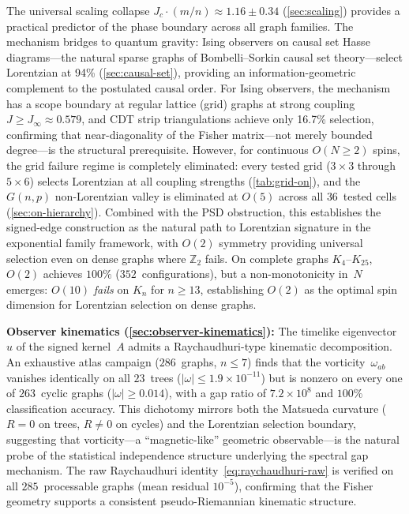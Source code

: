 \documentclass[11pt]{article}
\theoremstyle{definition}
\theoremstyle{remark}
\begin{document}
The universal scaling collapse $J_c \cdot (m/n) \approx 1.16 \pm 0.34$
(\cref{sec:scaling}) provides a practical predictor of the phase boundary
across all graph families. The mechanism bridges to quantum gravity: Ising
observers on causal set Hasse diagrams---the natural sparse graphs of
Bombelli--Sorkin causal set theory---select Lorentzian at 94\%
(\cref{sec:causal-set}), providing an information-geometric complement
to the postulated causal order. For Ising observers, the mechanism has a scope boundary at
regular lattice (grid) graphs at strong coupling $J \geq J_\infty \approx 0.579$,
and CDT strip triangulations achieve only 16.7\%
selection, confirming that near-diagonality of the Fisher matrix---not merely
bounded degree---is the structural prerequisite. However, for continuous
$O(N \geq 2)$ spins, the grid failure regime is completely eliminated:
every tested grid ($3 \times 3$ through $5 \times 6$) selects Lorentzian at
all coupling strengths (\cref{tab:grid-on}), and the $G(n,p)$
non-Lorentzian valley is eliminated at $O(5)$ across all $36$~tested cells
(\cref{sec:on-hierarchy}). Combined with the PSD
obstruction, this establishes the signed-edge construction as the natural
path to Lorentzian signature in the exponential family framework, with
$O(2)$ symmetry providing universal selection even on dense graphs
where $\mathbb{Z}_2$ fails.  On complete graphs $K_4$--$K_{25}$, $O(2)$
achieves $100\%$ ($352$~configurations), but a non-monotonicity in~$N$
emerges: $O(10)$ \emph{fails} on $K_n$ for $n \geq 13$, establishing
$O(2)$ as the optimal spin dimension for Lorentzian selection on dense graphs.

\textbf{Observer kinematics (\cref{sec:observer-kinematics}):}
The timelike eigenvector~$u$ of the signed kernel~$A$ admits a
Raychaudhuri-type kinematic decomposition. An exhaustive atlas
campaign ($286$~graphs, $n \leq 7$) finds that the
vorticity~$\omega_{ab}$ vanishes identically on all $23$~trees
($|\omega| \leq 1.9 \times 10^{-11}$) but is nonzero on every one
of $263$~cyclic graphs ($|\omega| \geq 0.014$), with a gap ratio
of $7.2 \times 10^{8}$ and $100\%$ classification accuracy.
This dichotomy mirrors both the Matsueda curvature ($R = 0$ on trees,
$R \neq 0$ on cycles) and the Lorentzian selection boundary,
suggesting that vorticity---a ``magnetic-like'' geometric
observable---is the natural probe of the statistical independence
structure underlying the spectral gap mechanism.
The raw Raychaudhuri identity~\eqref{eq:raychaudhuri-raw} is verified
on all $285$~processable graphs (mean residual $10^{-5}$),
confirming that the Fisher geometry supports a consistent
pseudo-Riemannian kinematic structure.
\end{document}
